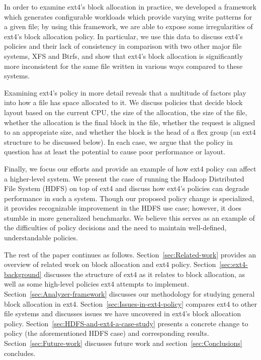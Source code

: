 \documentclass{acm_proc_article-sp}
\begin{document}
 
In order to examine ext4's block allocation in practice, we developed a framework which generates configurable workloads which provide varying write patterns for a given file; by using this framework, we are able to expose some irregularities of ext4's block allocation policy.  In particular, we use this data to discuss ext4's policies and their lack of consistency in comparison with two other major file systems, XFS and Btrfs, and show that ext4's block allocation is significantly more inconsistent for the same file written in various ways compared to these systems.
 
Examining ext4's policy in more detail reveals that a multitude of factors play into how a file has space allocated to it.  We discuss policies that decide block layout based on the current CPU, the size of the allocation, the size of the file, whether the allocation is the final block in the file, whether the request is aligned to an appropriate size, and whether the block is the head of a flex group (an ext4 structure to be discussed below).  In each case, we argue that the policy in question has at least the potential to cause poor performance or layout.
 
Finally, we focus our efforts and provide an example of how ext4 policy can affect a higher-level system.  We present the case of running the Hadoop Distributed File System (HDFS) on top of ext4 and discuss how ext4's policies can degrade performance in such a system.  Though our proposed policy change is specialized, it provides recognizable improvement in the HDFS use case; however, it does stumble in more generalized benchmarks.  We believe this serves as an example of the difficulties of policy decisions and the need to maintain well-defined, understandable policies.
 
The rest of the paper continues as follows.  Section~\ref{sec:Related-work} provides an overview of related work on block allocation and ext4 policy.  Section~\ref{sec:ext4-background} discusses the structure of ext4 as it relates to block allocation, as well as some high-level policies ext4 attempts to implement.  Section~\ref{sec:Analyzer-framework} discusses our methodology for studying general block allocation in ext4.  Section~\ref{sec:Issues-in-ext4-policy} compares ext4 to other file systems and discusses issues we have uncovered in ext4's block allocation policy.  Section~\ref{sec:HDFS-and-ext4-a-case-study} presents a concrete change to policy (the aforementioned HDFS case) and corresponding results.  Section~\ref{sec:Future-work} discusses future work and section~\ref{sec:Conclusions} concludes.
\end{document}
